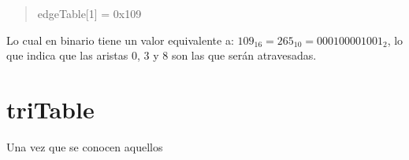 \begin{quote}
	edgeTable[1] = 0x109
\end{quote}

Lo cual en binario tiene un valor equivalente a: $109_{16} = 265_{10} = 0001 0000 1001_{2}$, lo que indica que las aristas $0$, $3$ y $8$ son las que serán atravesadas.

\section{triTable}
\label{ch:implementacion:sec:triTable}

Una vez que se conocen aquellos